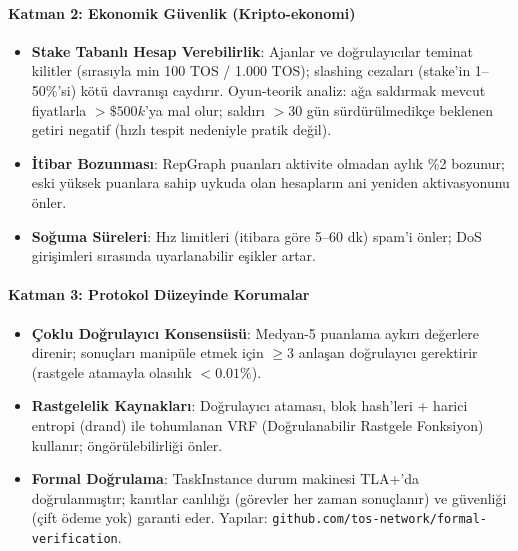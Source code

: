 \documentclass[11pt]{article}
\begin{document}
\begin{itemize}[noitemsep]
\begin{itemize}[noitemsep]
\begin{itemize}[noitemsep]
\begin{itemize}[noitemsep]
\begin{itemize}[noitemsep]
\begin{itemize}[noitemsep]
\begin{itemize}[noitemsep]
\begin{enumerate}[noitemsep]
\begin{itemize}[noitemsep]
\paragraph{Katman 2: Ekonomik Güvenlik (Kripto-ekonomi)}
\begin{itemize}[noitemsep]
  \item \textbf{Stake Tabanlı Hesap Verebilirlik}: Ajanlar ve doğrulayıcılar teminat kilitler (sırasıyla min 100 TOS / 1.000 TOS); slashing cezaları (stake'in 1--50\%'si) kötü davranışı caydırır. Oyun-teorik analiz: ağa saldırmak mevcut fiyatlarla $>\$500k$'ya mal olur; saldırı $>30$ gün sürdürülmedikçe beklenen getiri negatif (hızlı tespit nedeniyle pratik değil).
  \item \textbf{İtibar Bozunması}: RepGraph puanları aktivite olmadan aylık \%2 bozunur; eski yüksek puanlara sahip uykuda olan hesapların ani yeniden aktivasyonunu önler.
  \item \textbf{Soğuma Süreleri}: Hız limitleri (itibara göre 5--60 dk) spam'i önler; DoS girişimleri sırasında uyarlanabilir eşikler artar.
\end{itemize}

\paragraph{Katman 3: Protokol Düzeyinde Korumalar}
\begin{itemize}[noitemsep]
  \item \textbf{Çoklu Doğrulayıcı Konsensüsü}: Medyan-5 puanlama aykırı değerlere direnir; sonuçları manipüle etmek için $\geq3$ anlaşan doğrulayıcı gerektirir (rastgele atamayla olasılık $<0.01\%$).
  \item \textbf{Rastgelelik Kaynakları}: Doğrulayıcı ataması, blok hash'leri + harici entropi (drand) ile tohumlanan VRF (Doğrulanabilir Rastgele Fonksiyon) kullanır; öngörülebilirliği önler.
  \item \textbf{Formal Doğrulama}: TaskInstance durum makinesi TLA+'da doğrulanmıştır; kanıtlar canlılığı (görevler her zaman sonuçlanır) ve güvenliği (çift ödeme yok) garanti eder. Yapılar: \texttt{github.com/tos-network/formal-verification}.
\end{itemize}


\end{itemize}
\end{enumerate}
\end{itemize}
\end{itemize}
\end{itemize}
\end{itemize}
\end{itemize}
\end{itemize}
\end{itemize}
\end{document}
